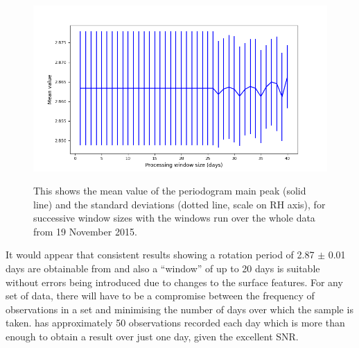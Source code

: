 \begin{figure}[!htbp]
\begin{center}
\includegraphics[scale=0.40]{k2/images/k2winsizes.png} \\
\vspace{-.5cm}
\end{center}
\caption{This shows the mean value of the
periodogram main peak (solid line) and the
standard deviations (dotted line, scale on RH
axis), for successive window sizes with the
windows run over the whole data from 19 November
2015.}\protect\label{fig:k2winsizes}
\end{figure}

It would appear that consistent results showing a rotation period of 2.87 $\pm$
0.01 days are obtainable from {\ktwo} and also a ``window'' of up to 20 days is
suitable without errors being introduced due to changes to the surface features.
For any set of data, there will have to be a compromise between the frequency
of observations in a set and minimising the number of days over which the sample is taken.
{\ktwo} has approximately 50 observations recorded each day which is more than enough
to obtain a result over just one day, given the excellent SNR.
